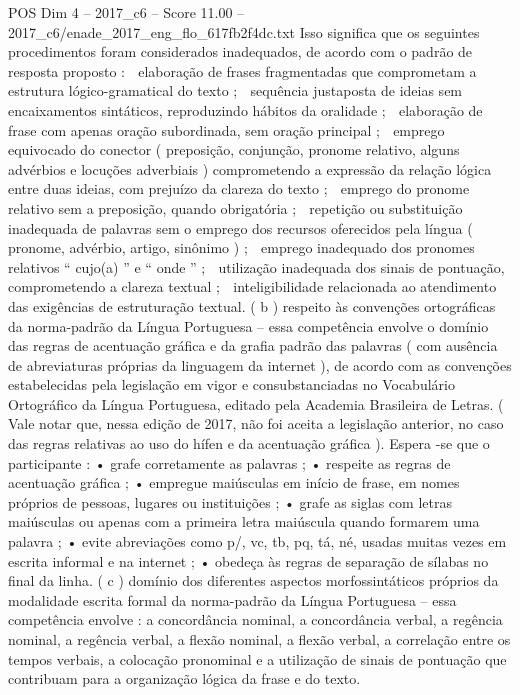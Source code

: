 \begin{textsample}{POS Dim 4 – 2017\_c6 – Score 11.00 – 2017\_c6/enade\_2017\_eng\_flo\_617fb2f4dc.txt}
Isso significa que os seguintes procedimentos foram considerados inadequados, de acordo com o padrão de resposta proposto :  elaboração de frases fragmentadas que comprometam a estrutura lógico-gramatical do texto ;  sequência justaposta de ideias sem encaixamentos sintáticos, reproduzindo hábitos da oralidade ;  elaboração de frase com apenas oração subordinada, sem oração principal ;  emprego equivocado do conector ( preposição, conjunção, pronome relativo, alguns advérbios e locuções adverbiais ) comprometendo a expressão da relação lógica entre duas ideias, com prejuízo da clareza do texto ;  emprego do pronome relativo sem a preposição, quando obrigatória ;  repetição ou substituição inadequada de palavras sem o emprego dos recursos oferecidos pela língua ( pronome, advérbio, artigo, sinônimo ) ;  emprego inadequado dos pronomes relativos “ cujo(a) ” e “ onde ” ;  utilização inadequada dos sinais de pontuação, comprometendo a clareza textual ;  inteligibilidade relacionada ao atendimento das exigências de estruturação textual. ( b ) respeito às convenções ortográficas da norma-padrão da Língua Portuguesa – essa competência envolve o domínio das regras de acentuação gráfica e da grafia padrão das palavras ( com ausência de abreviaturas próprias da linguagem da internet ), de acordo com as convenções estabelecidas pela legislação em vigor e consubstanciadas no Vocabulário Ortográfico da Língua Portuguesa, editado pela Academia Brasileira de Letras. ( Vale notar que, nessa edição de 2017, não foi aceita a legislação anterior, no caso das regras relativas ao uso do hífen e da acentuação gráfica ).
Espera -se que o participante : • grafe corretamente as palavras ; • respeite as regras de acentuação gráfica ; • empregue maiúsculas em início de frase, em nomes próprios de pessoas, lugares ou instituições ; • grafe as siglas com letras maiúsculas ou apenas com a primeira letra maiúscula quando formarem uma palavra ; • evite abreviações como p/, vc, tb, pq, tá, né, usadas muitas vezes em escrita informal e na internet ; • obedeça às regras de separação de sílabas no final da linha. ( c ) domínio dos diferentes aspectos morfossintáticos próprios da modalidade escrita formal da norma-padrão da Língua Portuguesa – essa competência envolve : a concordância nominal, a concordância verbal, a regência nominal, a regência verbal, a flexão nominal, a flexão verbal, a correlação entre os tempos verbais, a colocação pronominal e a utilização de sinais de pontuação que contribuam para a organização lógica da frase e do texto.

\end{textsample}
